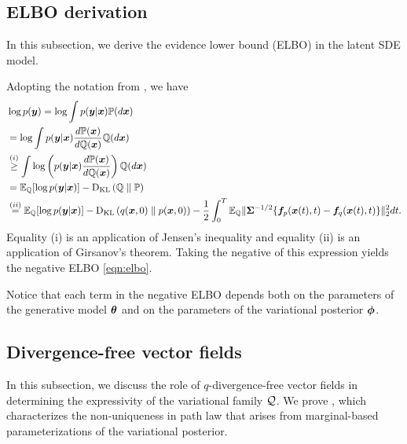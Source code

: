 \subsection{ELBO derivation}\label{app:subsec:elbo}
In this subsection, we derive the evidence lower bound (ELBO) in the latent SDE model. 

Adopting the notation from , we have
\begin{equation*}
\begin{aligned}
    &\log p(\boldsymbol{y}) = \log \int p(\boldsymbol{y} | \boldsymbol{x}) \mathbb{P}(d\boldsymbol{x})\\
    &= \log \int p(\boldsymbol{y} | \boldsymbol{x}) \frac{d \mathbb{P}(\boldsymbol{x})}{d \mathbb{Q}(\boldsymbol{x})} \mathbb{Q}(d\boldsymbol{x})\\
    &\overset{(i)}{\geq}  \int \log \left( p(\boldsymbol{y} | \boldsymbol{x})  \frac{d \mathbb{P}(\boldsymbol{x})}{d \mathbb{Q}(\boldsymbol{x})} \right) \mathbb{Q}(d\boldsymbol{x})
    \\
    &= \mathbb{E}_{\mathbb{Q}}[\log p(\boldsymbol{y} | \boldsymbol{x})] - \textrm{D}_{\textrm{KL}}\left(\mathbb{Q}\;\|\;\mathbb{P}\right)\\
    &\overset{(ii)}{=} \mathbb{E}_{\mathbb{Q}}[\log p(\boldsymbol{y} | \boldsymbol{x})] - \textrm{D}_{\textrm{KL}}\left(q(\boldsymbol{x}, 0)\;\|\;p(\boldsymbol{x}, 0)\right) - \frac{1}{2} \int_0^{T} \mathbb{E}_{\mathbb{Q}}\| \boldsymbol{\Sigma}^{-1/2}\{\boldsymbol{f}_p(\boldsymbol{x}(t),t) -  \boldsymbol{f}_q(\boldsymbol{x}(t),t)\}\|_2^2 dt.
\end{aligned}
\end{equation*}
Equality (i) is an application of Jensen's inequality and equality (ii) is an application of Girsanov's theorem. Taking the negative of this expression yields the negative ELBO \cref{eqn:elbo}. 

Notice that each term in the negative ELBO depends both on the parameters of the generative model $\boldsymbol{\theta}$ and on the parameters of the variational posterior $\boldsymbol{\phi}$.

\subsection{Divergence-free vector fields}\label{app:subsec:div-free}
In this subsection, we discuss the role of $q$-divergence-free vector fields in determining the expressivity of the variational family $\mathcal{Q}$. We prove , which characterizes the non-uniqueness in path law that arises from marginal-based parameterizations of the variational posterior.

